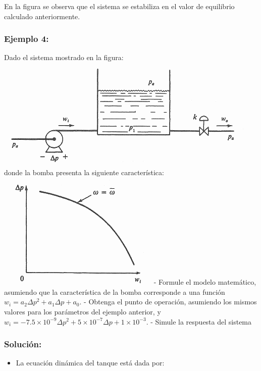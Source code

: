 \documentclass[11pt]{article}
\makeatletter
\def\maxwidth{\ifdim\Gin@nat@width>\linewidth\linewidth
    \else\Gin@nat@width\fi}
\let\Oldincludegraphics\includegraphics
\renewcommand{\includegraphics}[1]{\Oldincludegraphics[width=.8\maxwidth]{#1}}
\providecommand{\tightlist}{%
      \setlength{\itemsep}{0pt}\setlength{\parskip}{0pt}}
\makeatother
\begin{document}
    En la figura se observa que el sistema se estabiliza en el valor de
equilibrio calculado anteriormente.

    \subsubsection{Ejemplo 4:}\label{ejemplo-4}

Dado el sistema mostrado en la figura:
\includegraphics{img/pump_tank_valve.png} donde la bomba presenta la
siguiente característica:
\includegraphics{img/pump_tank_valve_curve.png} - Formule el modelo
matemático, asumiendo que la característica de la bomba corresponde a
una función \(w_i = a_2 \Delta p^2 + a_1 \Delta p + a_0\). - Obtenga el
punto de operación, asumiendo los mismos valores para los parámetros del
ejemplo anterior, y
\(w_i = -7.5 \times 10^{-9} \Delta p^2 + 5 \times 10^{-7} \Delta p + 1 \times 10^{-3}\).
- Simule la respuesta del sistema

    \subsubsection{Solución:}\label{soluciuxf3n}

\begin{itemize}
\tightlist
\item
  La ecuación dinámica del tanque está dada por:
\end{itemize}
\end{document}
